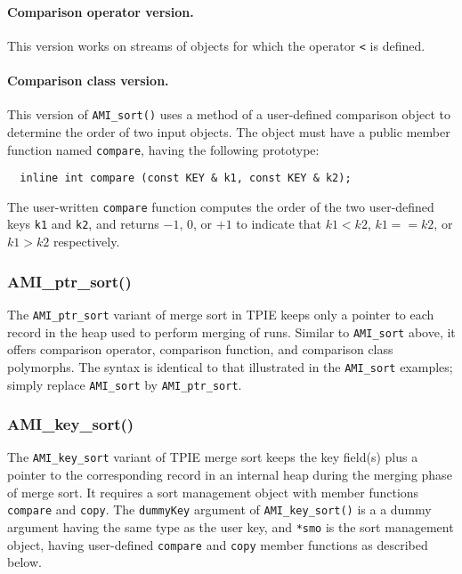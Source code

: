 \paragraph{Comparison operator version.} This version works on streams of
objects for which the operator \lstinline|<| is defined.

\paragraph{Comparison class version.} 
This version of \lstinline|AMI_sort()| uses a method of a user-defined
comparison object to determine the order of two input objects. The
object must have a public member function named \lstinline|compare|,
having the following prototype:
\begin{lstlisting}
  inline int compare (const KEY & k1, const KEY & k2);
\end{lstlisting}

The user-written \lstinline|compare| function computes the order of
the two user-defined keys \lstinline|k1| and \lstinline|k2|, and
returns $-1$, $0$, or $+1$ to indicate that $k1<k2$, $k1==k2$, or
$k1>k2$ respectively.


\subsubsection{AMI\_ptr\_sort()}

The \lstinline|AMI_ptr_sort| variant of merge sort in TPIE keeps only
a pointer to each record in the heap used to perform merging of runs.
Similar to \lstinline|AMI_sort| above, it offers comparison operator,
comparison function, and comparison class polymorphs. The syntax is
identical to that illustrated in the \lstinline|AMI_sort| examples;
simply replace \lstinline|AMI_sort| by \lstinline|AMI_ptr_sort|.


\subsubsection{AMI\_key\_sort()}

The \lstinline|AMI_key_sort| variant of TPIE merge sort keeps the key
field(s) plus a pointer to the corresponding record in an internal
heap during the merging phase of merge sort.  It requires a sort
management object with member functions \lstinline|compare| and
\lstinline|copy|.  The \lstinline|dummyKey| argument of
\lstinline|AMI_key_sort()| is a a dummy argument having the same type
as the user key, and
\lstinline|*smo| is the sort management object, having user-defined
\lstinline|compare| and \lstinline|copy| member functions as described
below.

